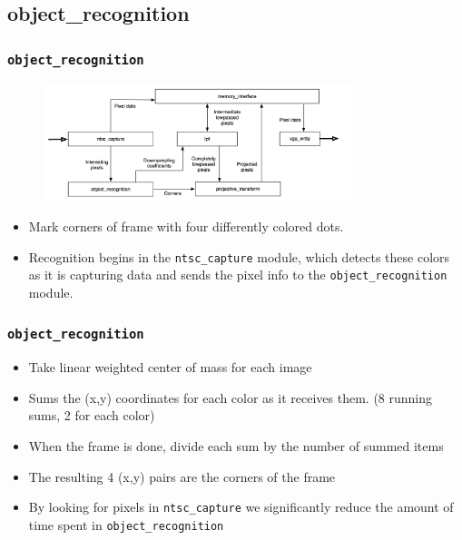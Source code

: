 \documentclass{beamer}
\begin{document}
\subsection{object\_recognition}


\begin{frame}
	\frametitle{{\tt object\_recognition}}

	\begin{figure}
		\centering
		\includegraphics[width=0.8\textwidth]{../proposal/simplified_block_diagram.png}
	\end{figure}
	
	\begin{itemize}
		\item Mark corners of frame with four differently colored dots.
		\item Recognition begins in the {\tt ntsc\_capture} module, which detects these colors as it is capturing data and sends the pixel info to the {\tt object\_recognition} module.
		
	\end{itemize}
\end{frame}

\begin{frame}
	\frametitle{{\tt object\_recognition}}

	\begin{itemize}
		\item Take linear weighted center of mass for each image
		\item Sums the (x,y) coordinates for each color as it receives them. (8 running sums, 2 for each color)
		\item When the frame is done, divide each sum by the number of summed items
		\item The resulting 4 (x,y) pairs are the corners of the frame
		\item By looking for pixels in {\tt ntsc\_capture} we significantly reduce the amount of time spent in {\tt object\_recognition}
	\end{itemize}
\end{frame}
\end{document}
